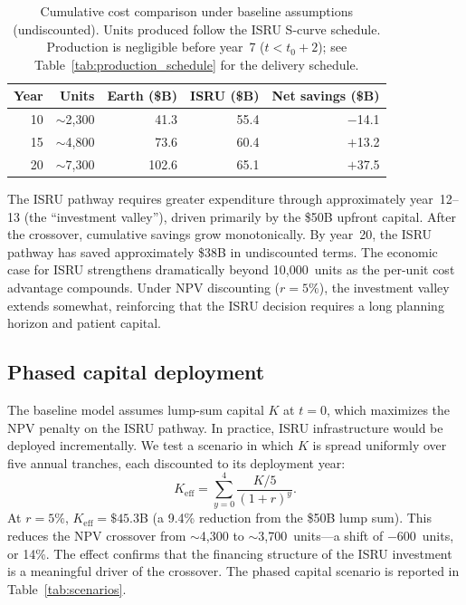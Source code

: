 \documentclass[preprint,12pt]{elsarticle}
\begin{document}
\begin{table}[htbp]
\centering
\caption{Cumulative cost comparison under baseline assumptions (undiscounted). Units produced follow the ISRU S-curve schedule. Production is negligible before year~7 ($t < t_0 + 2$); see Table~\ref{tab:production_schedule} for the delivery schedule.}
\label{tab:cumulative}
\begin{tabular}{@{}rrrrr@{}}
\toprule
Year & Units & Earth (\$B) & ISRU (\$B) & Net savings (\$B) \\
\midrule
10 & $\sim$2{,}300 & 41.3  & 55.4   & $-$14.1  \\
15 & $\sim$4{,}800 & 73.6  & 60.4   & $+$13.2  \\
20 & $\sim$7{,}300 & 102.6 & 65.1   & $+$37.5  \\
\bottomrule
\end{tabular}
\end{table}

The ISRU pathway requires greater expenditure through approximately year~12--13 (the ``investment valley''), driven primarily by the \$50B upfront capital. After the crossover, cumulative savings grow monotonically. By year~20, the ISRU pathway has saved approximately \$38B in undiscounted terms. The economic case for ISRU strengthens dramatically beyond 10{,}000~units as the per-unit cost advantage compounds. Under NPV discounting ($r = 5\%$), the investment valley extends somewhat, reinforcing that the ISRU decision requires a long planning horizon and patient capital.

\subsection{Phased capital deployment}
\label{sec:phased_capital}

The baseline model assumes lump-sum capital $K$ at $t = 0$, which maximizes the NPV penalty on the ISRU pathway. In practice, ISRU infrastructure would be deployed incrementally. We test a scenario in which $K$ is spread uniformly over five annual tranches, each discounted to its deployment year:
\begin{equation}
  K_{\mathrm{eff}} = \sum_{y=0}^{4} \frac{K/5}{(1+r)^y}.
  \label{eq:phased_capital}
\end{equation}
At $r = 5\%$, $K_{\mathrm{eff}} = \$45.3$B (a 9.4\% reduction from the \$50B lump sum). This reduces the NPV crossover from $\sim$4{,}300 to $\sim$3{,}700~units---a shift of $-$600~units, or 14\%. The effect confirms that the financing structure of the ISRU investment is a meaningful driver of the crossover. The phased capital scenario is reported in Table~\ref{tab:scenarios}.
\end{document}

